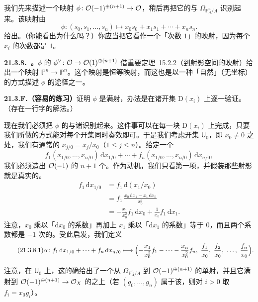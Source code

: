 我们先来描述一个映射 $\phi\colon\mathcal{O}(-1)^{\oplus(n+1)}\to\mathcal{O}$，稍后再把它的\trKernel{}与 $\Omega_{\mathbb{P}^n_A/A}$ 识别起来。该映射由
\[
\phi\colon(s_0,s_1,\dots,s_n)\longmapsto x_0s_0+x_1s_1+\cdots+x_ns_n.
\]
给出。（你能看出为什么吗？）你应当把它看作一个「次数 $1$」的映射，因为每个 $x_i$ 的次数都是 $1$。

\textbf{21.3.8.\ \trhRemark。}\quad $\phi$ 的\trDual{} $\phi^\vee\colon\mathcal{O}\to\mathcal{O}(1)^{\oplus(n+1)}$ 借\mbox{重要定理~15.2.2}（到射影空间的映射）给出一个映射 $\mathbb{P}^n\to\mathbb{P}^n$。这个映射是恒等映射，而这也是以一种「自然」（无坐标）的方式描述 $\phi$ 的途径之一。

\textbf{21.3.F.（容易的练习）}\quad 证明 $\phi$ 是满射，办法是在诸开集 $\mathrm{D}(x_i)$ 上逐一验证。（存在一行字的解法。）

现在我们必须把 $\phi$ 的\trKernel{}与诸\trDifferential{}识别起来。这件事可以在每一块 $\mathrm{D}(x_i)$ 上完成，只要我们所做的方式能对每个开集同时奏效即可。于是我们考虑开集 $\mathsf{U}_0$，即 $x_0\ne0$ 之处，我们有通常的\trCoordinate{} $x_{j/0}=x_j/x_0$（$1\le j\le n$）。给定一个\trDifferential
\[
f_1(x_{1/0},\dots,x_{n/0})\,\mathrm{d}x_{1/0}+\cdots+f_n(x_{1/0},\dots,x_{n/0})\,\mathrm{d}x_{n/0},
\]
我们必须造出 $\mathcal{O}(-1)$ 的 $n+1$ 个\trSection。作为动机，我们只看第一项，并假装那些射影\trCoordinate{}就是真实的\trCoordinate。
\[
\begin{aligned}
f_1\,\mathrm{d}x_{1/0}&=f_1\,\mathrm{d}(x_1/x_0)\\
&=f_1\,\frac{x_0\,\mathrm{d}x_1-x_1\,\mathrm{d}x_0}{x_0^2}\\
&=-\frac{x_1}{x_0^2}f_1\,\mathrm{d}x_0+\frac{1}{x_0}f_1\,\mathrm{d}x_1.
\end{aligned}
\]
注意，$x_0$ 乘以「$\mathrm{d}x_0$ 的系数」再加上 $x_1$ 乘以「$\mathrm{d}x_1$ 的系数」等于 $0$，而且两个系数都是 $-1$ 次\trHomogeneous{}的。受此启发，我们定义
\begin{equation*}\tag{21.3.8.1}\label{eq:euler-alpha-map}
\alpha\colon f_1\,\mathrm{d}x_{1/0}+\cdots+f_n\,\mathrm{d}x_{n/0}\longmapsto\Bigl(-\frac{x_1}{x_0^2}f_1-\cdots-\frac{x_n}{x_0^2}f_n,\ \frac{f_1}{x_0},\ \frac{f_2}{x_0},\ \dots,\ \frac{f_n}{x_0}\Bigr).
\end{equation*}

注意，在 $\mathsf{U}_0$ 上，这的确给出了一个从 $\Omega_{\mathbb{P}^n_A/A}$ 到 $\mathcal{O}(-1)^{\oplus(n+1)}$ 的单射，并且它满射到 $\mathcal{O}(-1)^{\oplus(n+1)}\to\mathcal{O}_X$ 的\trKernel{}之上（若 $(g_0,\dots,g_n)$ 属于该\trKernel，则对 $i>0$ 取 $f_i=x_0g_i$）。

